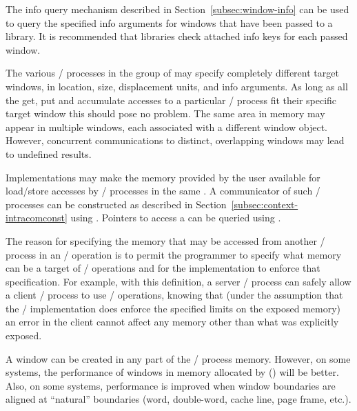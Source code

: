 \begin{users}
The info query mechanism described in Section~\ref{subsec:window-info}
can be used to query the specified info arguments
for
windows that have been
passed to a library. It is recommended that libraries check attached
info keys for each passed window.
\end{users}

The various \mpi/ processes in the group of
 may specify completely different
target windows, in location, size, displacement
units, and info arguments. 
As long as all the get, put and accumulate accesses 
to a particular \mpi/ process fit their
specific target window this should pose no problem.
The same area in memory may appear in multiple windows, each
associated with a different window object.  However, concurrent
communications to distinct, overlapping windows may lead to
undefined
results.

Implementations may make the memory provided by the user available for load/store accesses
by \MPI/ processes in the same .
A communicator of such \MPI/ processes can be constructed as described in Section~\ref{subsec:context-intracomconst} using .
Pointers to access a  can be queried
using .

\begin{rationale}
The reason for specifying the memory that may be accessed from another
\mpi/ process in an \RMA/ operation is to permit the programmer to specify
what memory can be a target of \RMA/ operations and for the
implementation to enforce that specification.  For example, with this
definition, a server \mpi/ process can safely allow a client \mpi/ process to use
\RMA/ operations, knowing that (under the assumption that the \MPI/
implementation does enforce the specified limits on the exposed
memory) an error in the client cannot affect any memory other than
what was explicitly exposed.  
\end{rationale}

\begin{users}
A window can be created in any part of the \mpi/ process memory.  However,
on some systems, the performance of windows in
memory allocated by  
() will be better.
Also, on some systems, performance is improved when window boundaries
are aligned at ``natural'' boundaries (word, double-word, cache line,
page frame, etc.).
\end{users}

